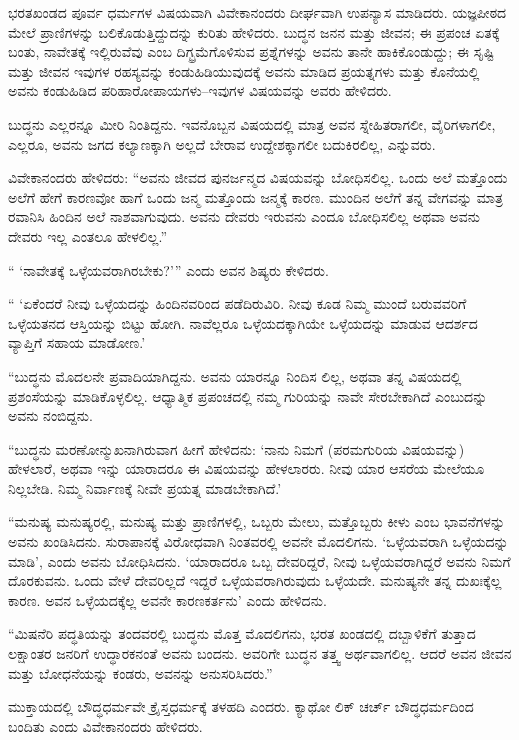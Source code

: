 ಭರತಖಂಡದ ಪೂರ್ವ ಧರ್ಮಗಳ ವಿಷಯವಾಗಿ ವಿವೇಕಾನಂದರು ದೀರ್ಘವಾಗಿ ಉಪನ್ಯಾಸ ಮಾಡಿದರು. ಯಜ್ಞಪೀಠದ ಮೇಲೆ ಪ್ರಾಣಿಗಳನ್ನು ಬಲಿಕೊಡುತ್ತಿದ್ದುದನ್ನು ಕುರಿತು ಹೇಳಿದರು. ಬುದ್ಧನ ಜನನ ಮತ್ತು ಜೀವನ; ಈ ಪ್ರಪಂಚ ಏತಕ್ಕೆ ಬಂತು, ನಾವೇತಕ್ಕೆ ಇಲ್ಲಿರುವೆವು ಎಂಬ ದಿಗ್ಭ್ರಮೆಗೊಳಿಸುವ ಪ್ರಶ್ನೆಗಳನ್ನು ಅವನು ತಾನೇ ಹಾಕಿಕೊಂಡುದ್ದು; ಈ ಸೃಷ್ಟಿ ಮತ್ತು ಜೀವನ ಇವುಗಳ ರಹಸ್ಯವನ್ನು ಕಂಡುಹಿಡಿಯುವುದಕ್ಕೆ ಅವನು ಮಾಡಿದ ಪ್ರಯತ್ನಗಳು ಮತ್ತು ಕೊನೆಯಲ್ಲಿ ಅವನು ಕಂಡುಹಿಡಿದ ಪರಿಹಾರೋಪಾಯಗಳು–ಇವುಗಳ ವಿಷಯವನ್ನು ಅವರು ಹೇಳಿದರು.

ಬುದ್ಧನು ಎಲ್ಲರನ್ನೂ ಮೀರಿ ನಿಂತಿದ್ದನು. ಇವನೊಬ್ಬನ ವಿಷಯದಲ್ಲಿ ಮಾತ್ರ ಅವನ ಸ್ನೇಹಿತರಾಗಲೀ, ವೈರಿಗಳಾಗಲೀ, ಎಲ್ಲರೂ, ಅವನು ಜಗದ ಕಲ್ಯಾಣಕ್ಕಾಗಿ ಅಲ್ಲದೆ ಬೇರಾವ ಉದ್ದೇಶಕ್ಕಾಗಲೀ ಬದುಕಿರಲಿಲ್ಲ, ಎನ್ನುವರು.

ವಿವೇಕಾನಂದರು ಹೇಳಿದರು: “ಅವನು ಜೀವದ ಪುನರ್ಜನ್ಮದ ವಿಷಯವನ್ನು ಬೋಧಿಸಲಿಲ್ಲ. ಒಂದು ಅಲೆ ಮತ್ತೊಂದು ಅಲೆಗೆ ಹೇಗೆ ಕಾರಣವೋ ಹಾಗೆ ಒಂದು ಜನ್ಮ ಮತ್ತೊಂದು ಜನ್ಮಕ್ಕೆ ಕಾರಣ. ಮುಂದಿನ ಅಲೆಗೆ ತನ್ನ ವೇಗವನ್ನು ಮಾತ್ರ ರವಾನಿಸಿ ಹಿಂದಿನ ಅಲೆ ನಾಶವಾಗುವುದು. ಅವನು ದೇವರು ಇರುವನು ಎಂದೂ ಬೋಧಿಸಲಿಲ್ಲ ಅಥವಾ ಅವನು ದೇವರು ಇಲ್ಲ ಎಂತಲೂ ಹೇಳಲಿಲ್ಲ.”

“ ‘ನಾವೇತಕ್ಕೆ ಒಳ್ಳೆಯವರಾಗಿರಬೇಕು?’” ಎಂದು ಅವನ ಶಿಷ್ಯರು ಕೇಳಿದರು.

“ ‘ಏಕೆಂದರೆ ನೀವು ಒಳ್ಳೆಯದನ್ನು ಹಿಂದಿನವರಿಂದ ಪಡೆದಿರುವಿರಿ. ನೀವು ಕೂಡ ನಿಮ್ಮ ಮುಂದೆ ಬರುವವರಿಗೆ ಒಳ್ಳೆಯತನದ ಆಸ್ತಿಯನ್ನು ಬಿಟ್ಟು ಹೋಗಿ. ನಾವೆಲ್ಲರೂ ಒಳ್ಳೆಯದಕ್ಕಾಗಿಯೇ ಒಳ್ಳೆಯದನ್ನು ಮಾಡುವ ಆದರ್ಶದ ವ್ಯಾಪ್ತಿಗೆ ಸಹಾಯ ಮಾಡೋಣ.’

“ಬುದ್ಧನು ಮೊದಲನೇ ಪ್ರವಾದಿಯಾಗಿದ್ದನು. ಅವನು ಯಾರನ್ನೂ ನಿಂದಿಸ ಲಿಲ್ಲ, ಅಥವಾ ತನ್ನ ವಿಷಯದಲ್ಲಿ ಪ್ರಶಂಸೆಯನ್ನು ಮಾಡಿಕೊಳ್ಳಲಿಲ್ಲ. ಆಧ್ಯಾತ್ಮಿಕ ಪ್ರಪಂಚದಲ್ಲಿ ನಮ್ಮ ಗುರಿಯನ್ನು ನಾವೇ ಸೇರಬೇಕಾಗಿದೆ ಎಂಬುದನ್ನು ಅವನು ನಂಬಿದ್ದನು.

“ಬುದ್ಧನು ಮರಣೋನ್ಮುಖನಾಗಿರುವಾಗ ಹೀಗೆ ಹೇಳಿದನು: ‘ನಾನು ನಿಮಗೆ (ಪರಮಗುರಿಯ ವಿಷಯವನ್ನು) ಹೇಳಲಾರೆ, ಅಥವಾ ಇನ್ನು ಯಾರಾದರೂ ಈ ವಿಷಯವನ್ನು ಹೇಳಲಾರರು. ನೀವು ಯಾರ ಆಸರೆಯ ಮೇಲೆಯೂ ನಿಲ್ಲಬೇಡಿ. ನಿಮ್ಮ ನಿರ್ವಾಣಕ್ಕೆ ನೀವೇ ಪ್ರಯತ್ನ ಮಾಡಬೇಕಾಗಿದೆ.’

“ಮನುಷ್ಯ ಮನುಷ್ಯರಲ್ಲಿ, ಮನುಷ್ಯ ಮತ್ತು ಪ್ರಾಣಿಗಳಲ್ಲಿ, ಒಬ್ಬರು ಮೇಲು, ಮತ್ತೊಬ್ಬರು ಕೀಳು ಎಂಬ ಭಾವನೆಗಳನ್ನು ಅವನು ಖಂಡಿಸಿದನು. ಸುರಾಪಾನಕ್ಕೆ ವಿರೋಧವಾಗಿ ನಿಂತವರಲ್ಲಿ ಅವನೇ ಮೊದಲಿಗನು. ‘ಒಳ್ಳೆಯವರಾಗಿ ಒಳ್ಳೆಯದನ್ನು ಮಾಡಿ’, ಎಂದು ಅವನು ಬೋಧಿಸಿದನು. ‘ಯಾರಾದರೂ ಒಬ್ಬ ದೇವರಿದ್ದರೆ, ನೀವು ಒಳ್ಳೆಯವರಾಗಿದ್ದರೆ ಅವನು ನಿಮಗೆ ದೊರಕುವನು. ಒಂದು ವೇಳೆ ದೇವರಿಲ್ಲದೆ ಇದ್ದರೆ ಒಳ್ಳೆಯವರಾಗಿರುವುದು ಒಳ್ಳೆಯದೇ. ಮನುಷ್ಯನೇ ತನ್ನ ದುಖಃಕ್ಕೆಲ್ಲ ಕಾರಣ. ಅವನ ಒಳ್ಳೆಯದಕ್ಕೆಲ್ಲ ಅವನೇ ಕಾರಣಕರ್ತನು’ ಎಂದು ಹೇಳಿದನು.

“ಮಿಷನೆರಿ ಪದ್ಧತಿಯನ್ನು ತಂದವರಲ್ಲಿ ಬುದ್ಧನು ಮೊತ್ತ ಮೊದಲಿಗನು, ಭರತ ಖಂಡದಲ್ಲಿ ದಬ್ಬಾಳಿಕೆಗೆ ತುತ್ತಾದ ಲಕ್ಷಾಂತರ ಜನರಿಗೆ ಉದ್ಧಾರಕನಂತೆ ಅವನು ಬಂದನು. ಅವರಿಗೇ ಬುದ್ಧನ ತತ್ತ್ವ ಅರ್ಥವಾಗಲಿಲ್ಲ. ಆದರೆ ಅವನ ಜೀವನ ಮತ್ತು ಬೋಧನೆಯನ್ನು ಕಂಡರು, ಅವನನ್ನು ಅನುಸರಿಸಿದರು.”

ಮುಕ್ತಾಯದಲ್ಲಿ ಬೌದ್ಧಧರ್ಮವೇ ಕ್ರೈಸ್ತಧರ್ಮಕ್ಕೆ ತಳಹದಿ ಎಂದರು. ಕ್ಯಾಥೋ ಲಿಕ್​ ಚರ್ಚ್​ ಬೌದ್ಧಧರ್ಮದಿಂದ ಬಂದಿತು ಎಂದು ವಿವೇಕಾನಂದರು ಹೇಳಿದರು.

